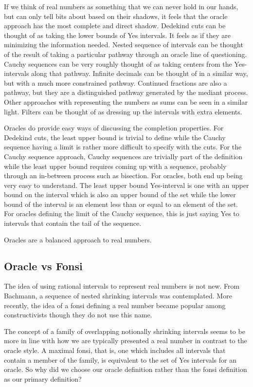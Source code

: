 \documentclass[12pt]{article}
\begin{document}
If we think of real numbers as something that we can never hold in our hands, but can only tell bits about based on their shadows, it feels that the oracle approach has the most complete and direct shadow. Dedekind cuts can be thought of as taking the lower bounds of Yes intervals. It feels as if they are minimizing the information needed.  Nested sequence of intervals can be thought of the result of taking a particular pathway through an oracle line of questioning. Cauchy sequences can be very roughly thought of as taking centers from the Yes-intervals along that pathway. Infinite decimals can be thought of in a similar way, but with a much more constrained pathway. Continued fractions are also a pathway, but they are a distinguished pathway generated by the mediant process. Other approaches with representing the numbers as sums can be seen in a  similar light. Filters can be thought of as dressing up the intervals with extra elements.

Oracles do provide easy ways of discussing the completion properties. For Dedekind cuts, the least upper bound is trivial to define while the Cauchy sequence having a limit is rather more difficult to specify with the cuts. For the Cauchy sequence approach, Cauchy sequences are trivially part of the definition while the least upper bound requires coming up with a sequence, probably through an in-between process such as bisection. For oracles, both end up being very easy to understand. The least upper bound Yes-interval is one with an upper bound on the interval which is also an upper bound of the set while the lower bound of the interval is an element less than or equal to an element of the set. For oracles defining the limit of the Cauchy sequence, this is just saying Yes to intervals that contain the tail of the sequence. 

Oracles are a balanced approach to real numbers. 

\subsection{Oracle vs Fonsi}

The idea of using rational intervals to represent real numbers is not new. From Bachmann, a sequence of nested shrinking intervals was contemplated. More recently, the idea of a fonsi defining a real number became popular among constructivists though they do not use this name.

The concept of a family of overlapping notionally shrinking intervals seems to be more in line with how we are typically presented a real number in contrast to the oracle style. A maximal fonsi, that is, one which includes all intervals that contain a member of the family, is equivalent to the set of Yes intervals for an oracle.  So why did we choose our oracle definition rather than the fonsi definition as our primary definition? 
\end{document}
